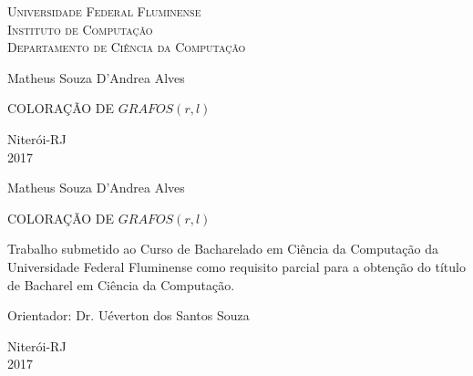 \documentclass[a4paper,oneside,12pt]{book}
\begin{document}

\begin{titlepage}
  \begin{center}
    \Large{\textsc{Universidade Federal Fluminense} \\
           \textsc{Instituto de Computação} \\
           \textsc{Departamento de Ciência da Computação}
          }
    \par\vspace{3.0cm}
    \LARGE{Matheus Souza D'Andrea Alves}
     \par\vspace{3.0cm}
    \bigskip
    \LARGE{COLORAÇÃO DE $GRAFOS(r,l)$}
    \par\vfill
    \Large{Niterói-RJ\\2017}
  \end{center}
\end{titlepage}




\setcounter{page}{2}




\begin{center}
Matheus Souza D'Andrea Alves


\vfill

COLORAÇÃO DE $GRAFOS(r,l)$

\vspace{3.0cm}

\begin{flushright}
\begin{minipage}{0.50\textwidth}

Trabalho submetido ao Curso de \linebreak Bacharelado em Ciência da
Computação
da Universidade Federal Fluminense como
requisito parcial para a obtenção do título de Bacharel em Ciência da
Computação.

\end{minipage}
\end{flushright}

\vspace{3.0cm}

\begin{flushleft}
Orientador: Dr. Uéverton dos Santos Souza 
\end{flushleft}

\vfill

Niterói-RJ\\2017

\end{center}
\end{document}
